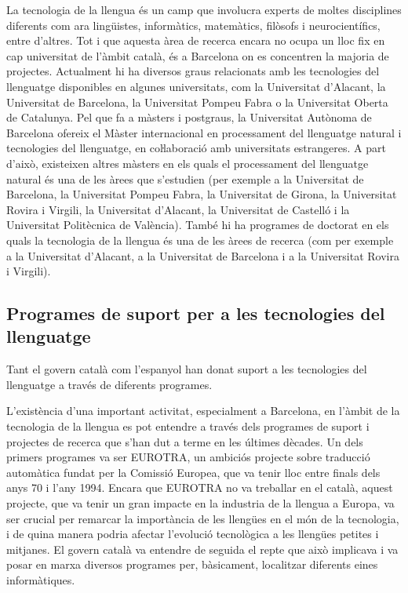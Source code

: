 \documentclass[]{../../metanetpaper}
\begin{document}
\begin{multicols}{2}
La tecnologia de la llengua és un camp que involucra experts de moltes disciplines diferents com ara lingüistes, informàtics, matemàtics, filòsofs i neurocientífics, entre d’altres. Tot i que aquesta àrea de recerca encara no ocupa un lloc fix en cap universitat de l’àmbit català, és a Barcelona on es concentren la majoria de projectes. 
Actualment hi ha diversos graus relacionats amb les tecnologies del llenguatge disponibles en algunes universitats, com la Universitat d’Alacant, la Universitat de Barcelona, la Universitat Pompeu Fabra o la Universitat Oberta de Catalunya.
Pel que fa a màsters i postgraus, la Universitat Autònoma de Barcelona ofereix el Màster internacional en processament del llenguatge natural i tecnologies del llenguatge, en coŀlaboració amb universitats estrangeres. A part d’això, existeixen altres màsters en els quals el processament del llenguatge natural és una de les àrees que s’estudien (per exemple a la Universitat de Barcelona, la Universitat Pompeu Fabra, la Universitat de Girona, la Universitat Rovira i Virgili, la Universitat d’Alacant, la Universitat de Castelló i la Universitat Politècnica de València). 
També hi ha programes de doctorat en els quals la tecnologia de la llengua és una de les àrees de recerca (com per exemple a la Universitat d’Alacant, a la Universitat de Barcelona i a la Universitat Rovira i Virgili).

\subsection{Programes de suport per a les tecnologies del llenguatge}

Tant el govern català com l’espanyol han donat suport a les tecnologies del llenguatge a través de diferents programes. 

L’existència d’una important activitat, especialment a Barcelona, en l’àmbit de la tecnologia de la llengua es pot entendre a través dels programes de suport i projectes de recerca que s’han dut a terme en les últimes dècades. Un dels primers programes va ser EUROTRA, un ambiciós projecte sobre traducció automàtica fundat per la Comissió Europea, que va tenir lloc entre finals dels anys 70 i l’any 1994. Encara que EUROTRA no va treballar en el català, aquest projecte, que va tenir un gran impacte en la industria de la llengua a Europa, va ser crucial per remarcar la importància de les llengües en el món de la tecnologia, i de quina manera podria afectar l’evolució tecnològica a les llengües petites i mitjanes. El govern català va entendre de seguida el repte que això implicava i va posar en marxa diversos programes per, bàsicament, localitzar diferents eines informàtiques. 


\end{multicols}
\end{document}
